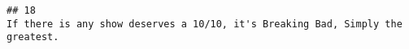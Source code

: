 \documentclass[
]{article}
\begin{document}
\begin{verbatim}
## 18                                                                                                                                                                                                                                                                                                                                                                                                                                                                                                                                                                                                                                                                                                                                                                                                                                                                                                                                                                                                                                                                                                                                                                                                                                                                                                                                                                                                                                                                                                                                                                                                                                                                                                                                                                                                                                                                                                                                                                                                                                                                                                                                   If there is any show deserves a 10/10, it's Breaking Bad, Simply the greatest.

\end{verbatim}
\end{document}
